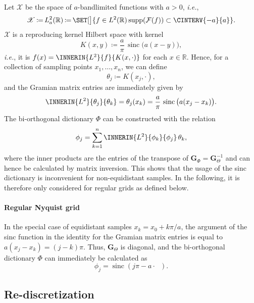 \documentclass[a4paper]{paper}
\newcommand*{\SPC}[1]{{\ensuremath{\mathscr{#1}}}}
\newcommand*{\SPCX}{\SPC{X}}
\newcommand{\RR}{{\ensuremath{\mathbb{R}}}}
\newcommand*{\OP}[1]{{\ensuremath{\mathcal{#1}}}}
\newcommand*{\FT}{\OP{F}}
\providecommand\GIVEN{}  %
\DeclareMathOperator{\SUPP}{{supp}}
\DeclareMathOperator{\SINC}{{sinc}}
\DeclareMathOperator{\DEFEQ}{{\coloneqq}}
\newcommand*{\ie}{\textsl{i.e.}\xspace}
\newcommand*{\BDG}{\boldsymbol{G}}
\begin{document}
Let $\SPCX$ be the space of $a$-bandlimited functions with $a > 0$, \ie, 
%
\begin{equation*}
 \SPCX \DEFEQ L^2_a(\RR) \DEFEQ \SET[\big]{f \in L^2(\RR) \GIVEN \SUPP(\FT(f)) \subset \CINTERV{-a}{a}}.
\end{equation*}
%
$\SPCX$ is a reproducing kernel Hilbert space with kernel
%
\begin{equation*}
 K(x,y) \DEFEQ \frac{a}{\pi}\, \SINC\big( a(x-y) \big),
\end{equation*}
%
\ie, it is $f(x) = \INNERIN{L^2}{f}{K(x, \cdot)}$ for each $x\in \RR$. Hence, for a collection of sampling points $x_1, 
\dots, x_n$, we can define
%
\begin{equation*}
 \theta_j \DEFEQ K(x_j, \cdot),
\end{equation*}
%
and the Gramian matrix entries are immediately given by 
%
\begin{equation*}
 \INNERIN{L^2}{\theta_j}{\theta_k} = \theta_j(x_k) 
 = \frac{a}{\pi}\, \SINC\big( a(x_j - x_k) \big).
\end{equation*}
%
The bi-orthogonal dictionary $\Phi$ can be constructed with the relation
%
\begin{equation*}
 \phi_j = \sum_{k=1}^n \INNERIN{L^2}{\phi_k}{\phi_j}\, \theta_k,
\end{equation*}
%
where the inner products are the entries of the transpose of $\BDG_\Phi = \BDG_\Theta^{-1}$ and can hence be calculated 
by matrix inversion. This shows that the usage of the sinc dictionary is inconvenient for non-equidistant samples. 
In the following, it is therefore only considered for regular grids as defined below.

\paragraph{Regular Nyquist grid}

In the special case of equidistant samples $x_k = x_0 + k\pi/a$, the argument of the 
sinc function in the identity for the Gramian matrix entries is equal to $a(x_j - x_k) = (j-k)\pi$. Thus, 
$\BDG_\Theta$ is diagonal, and the bi-orthogonal dictionary $\Phi$ can immediately be calculated as
%
\begin{equation*}
 \phi_j = \SINC( j\pi - a\cdot\phantom{x}\!\!).
\end{equation*}





\subsection{Re-discretization}
\label{subsec:specif:rediscr}
\end{document}
